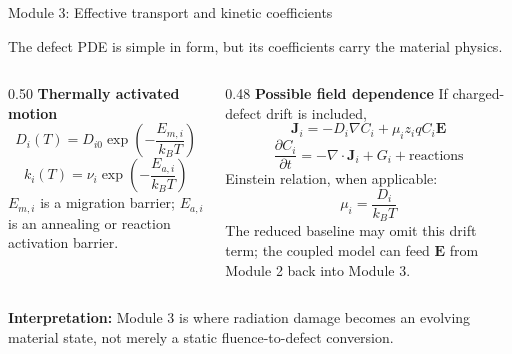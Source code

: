 \documentclass[aspectratio=169,9pt]{beamer}
\newcommand{\grad}{\nabla}
\newcommand{\divg}{\nabla\!\cdot}
\newcommand{\E}{\bm{E}}
\newcommand{\J}{\bm{J}}
\begin{document}
\begin{frame}{Module 3: Effective transport and kinetic coefficients}
\footnotesize
\vspace{-3mm}
\begin{bluebox}
\centering
The defect PDE is simple in form, but its coefficients carry the material physics.
\end{bluebox}

\vspace{1mm}
\begin{columns}[T,totalwidth=\textwidth]
\begin{column}{0.50\textwidth}
\textbf{Thermally activated motion}
\begin{equation*}
\boxed{D_i(T)=D_{i0}\exp\!\left(-\frac{E_{m,i}}{k_B T}\right)}
\end{equation*}
\begin{equation*}
\boxed{k_i(T)=\nu_i\exp\!\left(-\frac{E_{a,i}}{k_B T}\right)}
\end{equation*}
\small
\(E_{m,i}\) is a migration barrier; \(E_{a,i}\) is an annealing or reaction activation barrier.
\end{column}
\begin{column}{0.48\textwidth}
\textbf{Possible field dependence}
\small
If charged-defect drift is included,
\begin{equation*}
\boxed{\J_i=-D_i\grad C_i+\mu_i z_i q C_i\E}
\end{equation*}
\begin{equation*}
\boxed{\frac{\partial C_i}{\partial t}=-\divg\J_i+G_i+\text{reactions}}
\end{equation*}
Einstein relation, when applicable:
\begin{equation*}
\boxed{\mu_i=\frac{D_i}{k_B T}}
\end{equation*}
\small
The reduced baseline may omit this drift term; the coupled model can feed \(\E\) from Module 2 back into Module 3.
\end{column}
\end{columns}

\vspace{1mm}
\begin{purplebox}
\centering\scriptsize
\textbf{Interpretation:} Module 3 is where radiation damage becomes an evolving material state, not merely a static fluence-to-defect conversion.
\end{purplebox}
\end{frame}
\end{document}
